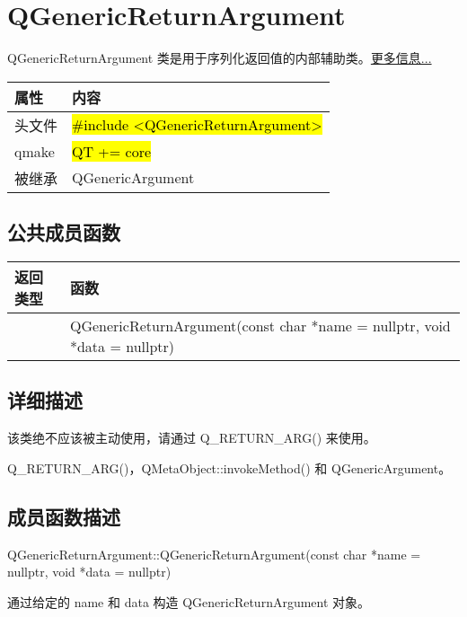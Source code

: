 \chapter{QGenericReturnArgument}

QGenericReturnArgument 类是用于序列化返回值的内部辅助类。\href{https://github.com/JackLovel/QtDocumentCN/blob/master/Src/G/QGenericReturnArgument/QGenericReturnArgument.md#%E8%AF%A6%E7%BB%86%E6%8F%8F%E8%BF%B0}{更多信息...}


\begin{tabular}{|l|l|}
\hline
属性& 	内容\\
\hline
头文件& 	\hl{\#include <QGenericReturnArgument>}\\
\hline
qmake& 	\hl{QT += core}\\
\hline
被继承& 	QGenericArgument\\
\hline
\end{tabular}


\splitLine

\section{公共成员函数}

\begin{tabular}{|l|m{30em}|}
\hline
返回类型& 	函数\\
\hline
 	&QGenericReturnArgument(const char *name = nullptr, void *data = nullptr)\\
\hline
\end{tabular}

\splitLine

\section{详细描述}

该类绝不应该被主动使用，请通过 Q\_RETURN\_ARG() 来使用。



\begin{notice}[另请参阅]
	Q\_RETURN\_ARG()，QMetaObject::invokeMethod() 和
QGenericArgument。
\end{notice}

\splitLine

\section{成员函数描述}

QGenericReturnArgument::QGenericReturnArgument(const char *name = nullptr, void *data = nullptr)

通过给定的 name 和 data 构造 QGenericReturnArgument 对象。

